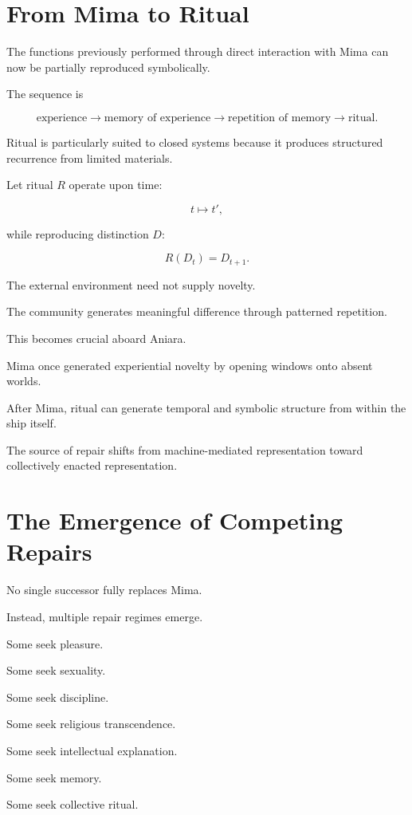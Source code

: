 \documentclass[11pt,oneside]{book}
\theoremstyle{definition}
\theoremstyle{remark}
\begin{document}
\section{From Mima to Ritual}

The functions previously performed through direct interaction with Mima can now be partially reproduced symbolically.

The sequence is

\[
\text{experience}
\rightarrow
\text{memory of experience}
\rightarrow
\text{repetition of memory}
\rightarrow
\text{ritual}.
\]

Ritual is particularly suited to closed systems because it produces structured recurrence from limited materials.

Let ritual \(R\) operate upon time:

\[
t\mapsto t',
\]

while reproducing distinction \(D\):

\[
R(D_t)=D_{t+1}.
\]

The external environment need not supply novelty.

The community generates meaningful difference through patterned repetition.

This becomes crucial aboard Aniara.

Mima once generated experiential novelty by opening windows onto absent worlds.

After Mima, ritual can generate temporal and symbolic structure from within the ship itself.

The source of repair shifts from machine-mediated representation toward collectively enacted representation.

\section{The Emergence of Competing Repairs}

No single successor fully replaces Mima.

Instead, multiple repair regimes emerge.

Some seek pleasure.

Some seek sexuality.

Some seek discipline.

Some seek religious transcendence.

Some seek intellectual explanation.

Some seek memory.

Some seek collective ritual.
\end{document}
